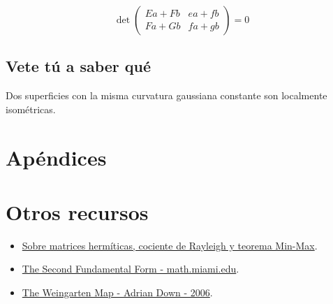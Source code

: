 \documentclass[nochap]{apuntes}
\begin{document}
\[ \det \begin{pmatrix}
Ea + Fb & ea + fb \\
Fa + Gb & fa + gb 
\end{pmatrix} = 0 \]


\section{Vete tú a saber qué}

\begin{theorem} Dos superficies con la misma curvatura gaussiana constante son localmente isométricas. \label{thmMinding}\end{theorem}

\appendix
\chapter{Apéndices}

\chapter{Otros recursos}
\begin{itemize}
\item \href{http://math.nyu.edu/~nica/hermitian.pdf}{Sobre matrices hermíticas, cociente de Rayleigh y teorema Min-Max}.
\item \href{http://www.math.miami.edu/~galloway/dgnotes/chpt5.pdf}{The Second Fundamental Form - math.miami.edu}.
\item \href{http://people.duke.edu/~ad159/files/m140/19.pdf}{The Weingarten Map - Adrian Down - 2006}.
\end{itemize}

\printindex
\end{document}
